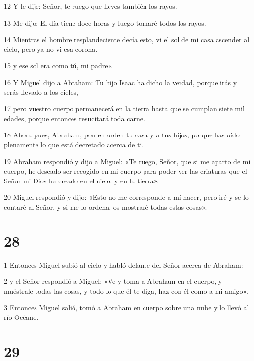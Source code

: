 \par 12 Y le dije: Señor, te ruego que lleves también los rayos.

\par 13 Me dijo: El día tiene doce horas y luego tomaré todos los rayos.

\par 14 Mientras el hombre resplandeciente decía esto, vi el sol de mi casa ascender al cielo, pero ya no vi esa corona.

\par 15 y ese sol era como tú, mi padre».

\par 16 Y Miguel dijo a Abraham: Tu hijo Isaac ha dicho la verdad, porque irás y serás llevado a los cielos,

\par 17 pero vuestro cuerpo permanecerá en la tierra hasta que se cumplan siete mil edades, porque entonces resucitará toda carne.

\par 18 Ahora pues, Abraham, pon en orden tu casa y a tus hijos, porque has oído plenamente lo que está decretado acerca de ti.

\par 19 Abraham respondió y dijo a Miguel: «Te ruego, Señor, que si me aparto de mi cuerpo, he deseado ser recogido en mi cuerpo para poder ver las criaturas que el Señor mi Dios ha creado en el cielo. y en la tierra».

\par 20 Miguel respondió y dijo: «Esto no me corresponde a mí hacer, pero iré y se lo contaré al Señor, y si me lo ordena, os mostraré todas estas cosas».

\chapter{28}

\par 1 Entonces Miguel subió al cielo y habló delante del Señor acerca de Abraham:

\par 2 y el Señor respondió a Miguel: «Ve y toma a Abraham en el cuerpo, y muéstrale todas las cosas, y todo lo que él te diga, haz con él como a mi amigo».

\par 3 Entonces Miguel salió, tomó a Abraham en cuerpo sobre una nube y lo llevó al río Océano.

\chapter{29}

